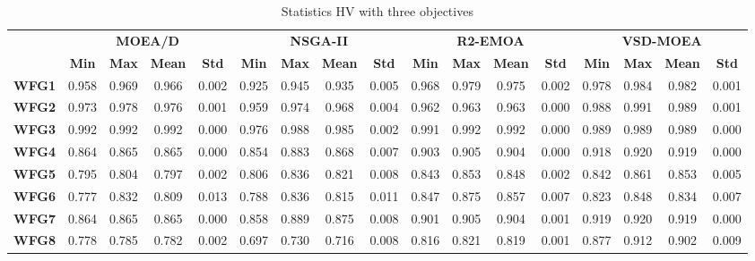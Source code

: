 \begin{table*}[]
\centering
\caption{Statistics HV with three objectives}
\label{tab:StatisticsHV_3obj}
\begin{scriptsize}
\begin{tabular}{c c|c|c|c|c|c|c|c|c|c|c|c|c|c|c|c}
\cline{2-17}
 & \multicolumn{4}{c|}{\textbf{MOEA/D}} & \multicolumn{4}{c|}{\textbf{NSGA-II}} & \multicolumn{4}{c|}{\textbf{R2-EMOA}} & \multicolumn{4}{c}{\textbf{VSD-MOEA}} \\ \cline{2-17} 
 & \textbf{Min} & \textbf{Max} & \textbf{Mean} & \textbf{Std} & \textbf{Min} & \textbf{Max} & \textbf{Mean} & \textbf{Std} & \textbf{Min} & \textbf{Max} & \textbf{Mean} & \textbf{Std} & \textbf{Min} & \textbf{Max} & \textbf{Mean} & \textbf{Std} \\ \hline
\multicolumn{1}{c|}{\textbf{WFG1}} & 0.958 & 0.969 & 0.966 & 0.002 & 0.925 & 0.945 & 0.935 & 0.005 & 0.968 & 0.979 & 0.975 & 0.002 & 0.978 & 0.984 & 0.982 & 0.001 \\ \hline
\multicolumn{1}{c|}{\textbf{WFG2}} & 0.973 & 0.978 & 0.976 & 0.001 & 0.959 & 0.974 & 0.968 & 0.004 & 0.962 & 0.963 & 0.963 & 0.000 & 0.988 & 0.991 & 0.989 & 0.001 \\ \hline
\multicolumn{1}{c|}{\textbf{WFG3}} & 0.992 & 0.992 & 0.992 & 0.000 & 0.976 & 0.988 & 0.985 & 0.002 & 0.991 & 0.992 & 0.992 & 0.000 & 0.989 & 0.989 & 0.989 & 0.000 \\ \hline
\multicolumn{1}{c|}{\textbf{WFG4}} & 0.864 & 0.865 & 0.865 & 0.000 & 0.854 & 0.883 & 0.868 & 0.007 & 0.903 & 0.905 & 0.904 & 0.000 & 0.918 & 0.920 & 0.919 & 0.000 \\ \hline
\multicolumn{1}{c|}{\textbf{WFG5}} & 0.795 & 0.804 & 0.797 & 0.002 & 0.806 & 0.836 & 0.821 & 0.008 & 0.843 & 0.853 & 0.848 & 0.002 & 0.842 & 0.861 & 0.853 & 0.005 \\ \hline
\multicolumn{1}{c|}{\textbf{WFG6}} & 0.777 & 0.832 & 0.809 & 0.013 & 0.788 & 0.836 & 0.815 & 0.011 & 0.847 & 0.875 & 0.857 & 0.007 & 0.823 & 0.848 & 0.834 & 0.007 \\ \hline
\multicolumn{1}{c|}{\textbf{WFG7}} & 0.864 & 0.865 & 0.865 & 0.000 & 0.858 & 0.889 & 0.875 & 0.008 & 0.901 & 0.905 & 0.904 & 0.001 & 0.919 & 0.920 & 0.919 & 0.000 \\ \hline
\multicolumn{1}{c|}{\textbf{WFG8}} & 0.778 & 0.785 & 0.782 & 0.002 & 0.697 & 0.730 & 0.716 & 0.008 & 0.816 & 0.821 & 0.819 & 0.001 & 0.877 & 0.912 & 0.902 & 0.009 \\ \hline

\end{tabular}
\end{scriptsize}
\end{table*}
